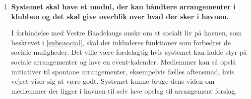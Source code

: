 \begin{enumerate}
\item \label{itm:events} \textbf{Systemet skal have et modul, der kan håndtere arrangementer i klubben og det skal give overblik over hvad der sker i havnen.}

I forbindelse med Vestre Baadelaugs ønske om et socialt liv på havnen, som beskrevet i \cref{subs:social}, skal der inkluderes funktioner som forbedrer de sociale muligheder. Det ville være fordelagtig hvis systemet kan holde styr på sociale arrangementer og lave en event-kalender. Medlemmer kan så opslå initiativer til spontane arrangementer, eksempelvis fælles aftensmad, hvis vejret viser sig at være godt. Systemet kunne bruge dens viden om medlemmer der ligger i havnen til selv lave opslag til arrangement forslag.

\end{enumerate}



%
